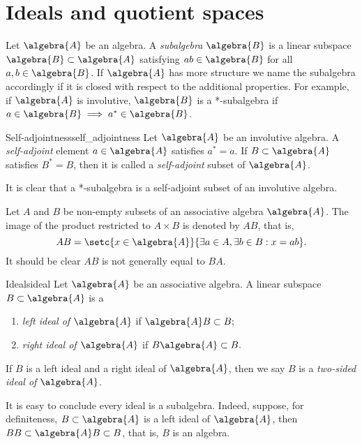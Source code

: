\section{Ideals and quotient spaces}
Let \(\algebra{A}\) be an algebra. A \emph{subalgebra} \(\algebra{B}\) is a linear subspace \(\algebra{B} \subset \algebra{A}\) satisfying \(ab \in \algebra{B}\) for all \(a, b \in \algebra{B}\). If \(\algebra{A}\) has more structure we name the subalgebra accordingly if it is closed with respect to the additional properties. For example, if \(\algebra{A}\) is involutive, \(\algebra{B}\) is a *-subalgebra if \(a \in \algebra{B} \implies a^* \in \algebra{B}\).
\begin{definition}{Self-adjointness}{self_adjointness}
    Let \(\algebra{A}\) be an involutive algebra. A \emph{self-adjoint} element \(a \in \algebra{A}\) satisfies \(a^* = a\). If \(B \subset \algebra{A}\) satisfies \(B^* = B\), then it is called a \emph{self-adjoint} subset of \(\algebra{A}\).
\end{definition}
\begin{remark}
    It is clear that a *-subalgebra is a self-adjoint subset of an involutive algebra.
\end{remark}

Let \(A\) and \(B\) be non-empty subsets of an associative algebra \(\algebra{A}\). The image of the product restricted to \(A \times B\) is denoted by \(AB\), that is,
\begin{equation*}
    AB = \setc{x \in \algebra{A}}{\exists a \in A, \exists b \in B : x = ab}.
\end{equation*}
It should be clear \(AB\) is not generally equal to \(BA\).
\begin{definition}{Ideals}{ideal}
    Let \(\algebra{A}\) be an associative algebra. A linear subspace \(B \subset \algebra{A}\) is a
    \begin{enumerate}[label=(\alph*)]
        \item \emph{left ideal of \(\algebra{A}\)} if \(\algebra{A}B \subset B;\)
        \item \emph{right ideal of \(\algebra{A}\)} if \(B\algebra{A} \subset B.\)
    \end{enumerate}
    If \(B\) is a left ideal and a right ideal of \(\algebra{A}\), then we say \(B\) is a \emph{two-sided ideal of \(\algebra{A}\)}.
\end{definition}
\begin{remark}
    It is easy to conclude every ideal is a subalgebra. Indeed, suppose, for definiteness, \(B \subset \algebra{A}\) is a left ideal of \(\algebra{A}\), then \(BB \subset \algebra{A}B \subset B\), that is, \(B\) is an algebra.
\end{remark}

